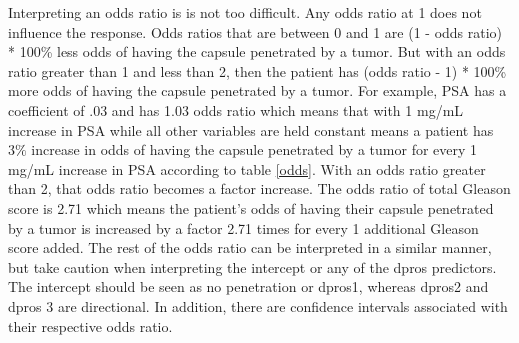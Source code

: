 \documentclass{article}\usepackage[]{graphicx}\usepackage[]{color}
\begin{document}
\qquad Interpreting an odds ratio is is not too difficult. Any odds ratio at 1 does not influence the response. Odds ratios that are between 0 and 1 are (1 - odds ratio) * 100\% less odds of having the capsule penetrated by a tumor. But with an odds ratio greater than 1 and less than 2, then the patient has (odds ratio - 1) * 100\% more odds of having the capsule penetrated by a tumor. For example, PSA has a coefficient of .03 and has 1.03 odds ratio which means that with 1 mg/mL increase in PSA while all other variables are held constant means a patient has $3\%$ increase in odds of having the capsule penetrated by a tumor for every 1 mg/mL increase in PSA according to table \ref{odds}. With an odds ratio greater than 2, that odds ratio becomes a factor increase. The odds ratio of total Gleason score is 2.71 which means the patient's odds of having their capsule penetrated by a tumor is increased by a factor 2.71 times for every 1 additional Gleason score added. The rest of the odds ratio can be interpreted in a similar manner, but take caution when interpreting the intercept or any of the dpros predictors. The intercept should be seen as no penetration or dpros1, whereas dpros2 and dpros 3 are directional. In addition, there are confidence intervals associated with their respective odds ratio.
\end{document}
